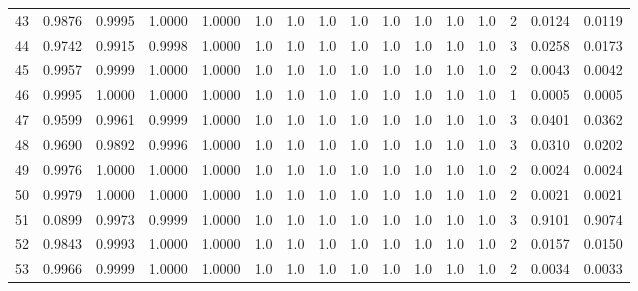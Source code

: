 \begin{tabular}{lrrrrrrrrrrrrrrr}
43  &      0.9876 &  0.9995 &  1.0000 &  1.0000 &     1.0 &     1.0 &     1.0 &     1.0 &     1.0 &     1.0 &      1.0 &        1.0 &      2 &                    0.0124 &                     0.0119 \\
44  &      0.9742 &  0.9915 &  0.9998 &  1.0000 &     1.0 &     1.0 &     1.0 &     1.0 &     1.0 &     1.0 &      1.0 &        1.0 &      3 &                    0.0258 &                     0.0173 \\
45  &      0.9957 &  0.9999 &  1.0000 &  1.0000 &     1.0 &     1.0 &     1.0 &     1.0 &     1.0 &     1.0 &      1.0 &        1.0 &      2 &                    0.0043 &                     0.0042 \\
46  &      0.9995 &  1.0000 &  1.0000 &  1.0000 &     1.0 &     1.0 &     1.0 &     1.0 &     1.0 &     1.0 &      1.0 &        1.0 &      1 &                    0.0005 &                     0.0005 \\
47  &      0.9599 &  0.9961 &  0.9999 &  1.0000 &     1.0 &     1.0 &     1.0 &     1.0 &     1.0 &     1.0 &      1.0 &        1.0 &      3 &                    0.0401 &                     0.0362 \\
48  &      0.9690 &  0.9892 &  0.9996 &  1.0000 &     1.0 &     1.0 &     1.0 &     1.0 &     1.0 &     1.0 &      1.0 &        1.0 &      3 &                    0.0310 &                     0.0202 \\
49  &      0.9976 &  1.0000 &  1.0000 &  1.0000 &     1.0 &     1.0 &     1.0 &     1.0 &     1.0 &     1.0 &      1.0 &        1.0 &      2 &                    0.0024 &                     0.0024 \\
50  &      0.9979 &  1.0000 &  1.0000 &  1.0000 &     1.0 &     1.0 &     1.0 &     1.0 &     1.0 &     1.0 &      1.0 &        1.0 &      2 &                    0.0021 &                     0.0021 \\
51  &      0.0899 &  0.9973 &  0.9999 &  1.0000 &     1.0 &     1.0 &     1.0 &     1.0 &     1.0 &     1.0 &      1.0 &        1.0 &      3 &                    0.9101 &                     0.9074 \\
52  &      0.9843 &  0.9993 &  1.0000 &  1.0000 &     1.0 &     1.0 &     1.0 &     1.0 &     1.0 &     1.0 &      1.0 &        1.0 &      2 &                    0.0157 &                     0.0150 \\
53  &      0.9966 &  0.9999 &  1.0000 &  1.0000 &     1.0 &     1.0 &     1.0 &     1.0 &     1.0 &     1.0 &      1.0 &        1.0 &      2 &                    0.0034 &                     0.0033 \\

\end{tabular}
